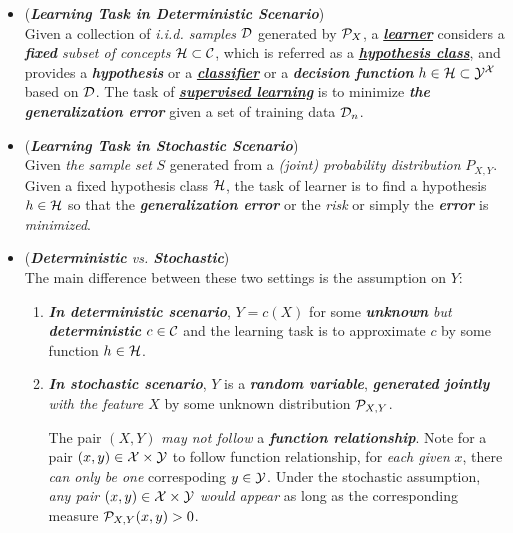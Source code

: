 \documentclass[11pt]{article}
\begin{document}
\begin{itemize}
\item \begin{remark} (\emph{\textbf{Learning Task in Deterministic Scenario}})\\
Given a collection of \emph{i.i.d.  samples} ${\mathcal D}$ generated by ${\mathcal P}_{X}$, a \underline{\emph{\textbf{learner}}}  considers a \emph{\textbf{fixed} subset of concepts}  ${\mathcal H}\subset {\mathcal C}$, which is referred as a \underline{\emph{\textbf{hypothesis class}}}, and provides a \emph{\textbf{hypothesis}} or a \underline{\emph{\textbf{classifier}}} or a \emph{\textbf{decision function}} $h \in {\mathcal H} \subset {\mathcal Y}^{{\mathcal X}}$ based on ${\mathcal D}$. The task of \underline{\emph{\textbf{supervised learning}}} is to minimize \emph{\textbf{the generalization error}} given a set of training data ${\mathcal D}_n$.
\end{remark}

\item \begin{remark} (\emph{\textbf{Learning Task in Stochastic Scenario}})\\
Given \emph{the sample set} $S$ generated from a \emph{(joint) probability distribution} $P_{X, Y}$. Given a fixed hypothesis class ${\mathcal H}$, the task of learner is to find a hypothesis $h \in {\mathcal H}$ so that the \emph{\textbf{generalization error}} or the \emph{risk} or simply the \emph{\textbf{error}} is \emph{minimized}. 
\end{remark}

\item \begin{remark} (\emph{\textbf{Deterministic} vs. \textbf{Stochastic}})\\
The main difference between these two settings is the assumption on $Y$:
\begin{enumerate}
\item \emph{\textbf{In deterministic scenario}}, $Y = c(X)$ for some \emph{\textbf{unknown} but \textbf{deterministic}} $c \in {\mathcal C}$ and the learning task is to approximate $c$ by some function $h  \in {\mathcal H}$.

\item \emph{\textbf{In stochastic scenario}}, $Y$ is a \emph{\textbf{random variable}}, \emph{\textbf{generated jointly} with the feature $X$} by some unknown distribution ${\mathcal P}_{X, Y}$. 

The pair $(X, Y)$ \emph{may not follow} a \emph{\textbf{function relationship}}. Note for a pair $(x, y) \in {\mathcal X} \times {\mathcal Y}$ to follow function relationship, for \emph{each given} $x$, there \emph{can only be one} correspoding $y \in {\mathcal Y}$. Under the stochastic assumption, \emph{any pair $(x,y)  \in {\mathcal X} \times {\mathcal Y}$ would appear} as long as the corresponding measure ${\mathcal P}_{X,Y}(x, y) >0$. 
\end{enumerate}
\end{remark}
\end{itemize}
\end{document}
